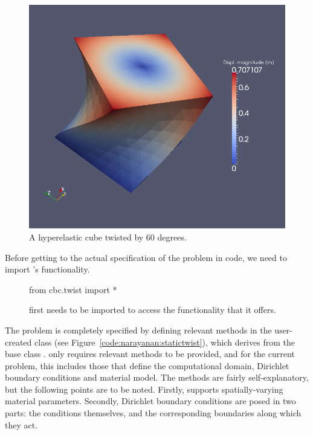\begin{figure}
  \center\includegraphics{chapters/narayanan/images/png/twistedcube.png}
  \caption{A hyperelastic cube twisted by 60 degrees.}
    \label{fig:narayanan:twistedcube}
\end{figure}

Before getting to the actual specification of the problem in code, we
need to import \twist's functionality.
\begin{figure}
\begin{python}
from cbc.twist import *
\end{python}
\caption{\twist{} first needs to be imported to access the
  functionality that it offers.}
\end{figure}
The problem is completely specified by defining relevant methods in
the user-created class  (see
Figure~\ref{code:narayanan:statictwist}), which derives from the base
class . \twist{} only requires relevant
methods to be provided, and for the current problem, this includes
those that define the computational domain, Dirichlet boundary
conditions and material model. The methods are fairly
self-explanatory, but the following points are to be noted. Firstly,
\twist{} supports spatially-varying material parameters. Secondly,
Dirichlet boundary conditions are posed in two parts: the conditions
themselves, and the corresponding boundaries along which they act.

